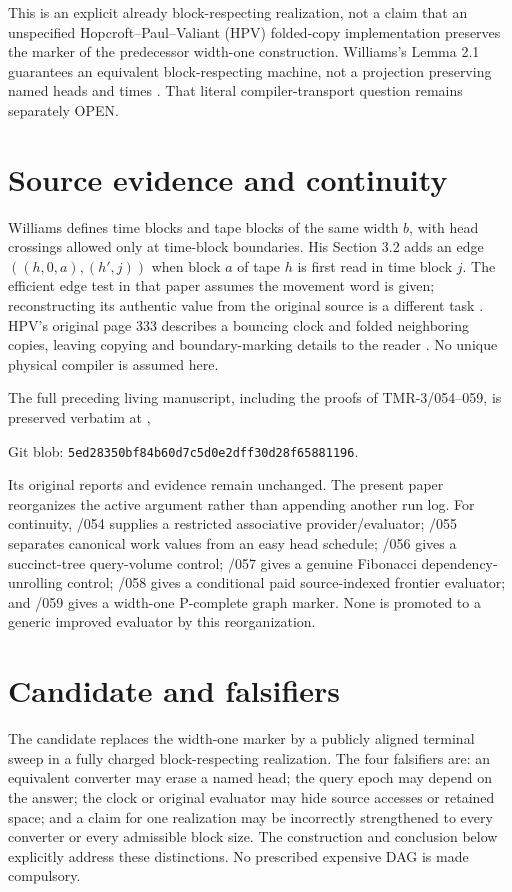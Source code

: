 \documentclass[11pt]{article}
\begin{document}
This is an explicit already block-respecting realization, not a claim that
an unspecified Hopcroft--Paul--Valiant (HPV) folded-copy implementation
preserves the marker of the predecessor width-one construction.
Williams's Lemma 2.1 guarantees an equivalent block-respecting machine,
not a projection preserving named heads and times \cite{Williams2025,HPV1977}.
That literal compiler-transport question remains separately OPEN.

\section{Source evidence and continuity}
Williams defines time blocks and tape blocks of the same width $b$, with
head crossings allowed only at time-block boundaries. His Section 3.2
adds an edge $((h,0,a),(h',j))$ when block $a$ of tape $h$ is first read
in time block $j$. The efficient edge test in that paper assumes the
movement word is given; reconstructing its authentic value from the
original source is a different task \cite{Williams2025}.
HPV's original page 333 describes a bouncing clock and folded neighboring
copies, leaving copying and boundary-marking details to the reader
\cite{HPV1977}. No unique physical compiler is assumed here.

The full preceding living manuscript, including the proofs of
TMR-3/054--059, is preserved verbatim at
,
\par\noindent Git blob: \texttt{5ed28350bf84b60d7c5d0e2dff30d28f65881196}.\par
Its original reports and evidence remain unchanged. The present paper
reorganizes the active argument rather than appending another run log.
For continuity, /054 supplies a restricted associative provider/evaluator;
/055 separates canonical work values from an easy head schedule;
/056 gives a succinct-tree query-volume control;
/057 gives a genuine Fibonacci dependency-unrolling control;
/058 gives a conditional paid source-indexed frontier evaluator; and
/059 gives a width-one P-complete graph marker. None is promoted to a
generic improved evaluator by this reorganization.

\section{Candidate and falsifiers}
The candidate replaces the width-one marker by a publicly aligned
terminal sweep in a fully charged block-respecting realization.
The four falsifiers are: an equivalent converter may erase a named head;
the query epoch may depend on the answer; the clock or original evaluator
may hide source accesses or retained space; and a claim for one realization
may be incorrectly strengthened to every converter or every admissible
block size. The construction and conclusion below explicitly address
these distinctions. No prescribed expensive DAG is made compulsory.
\end{document}
